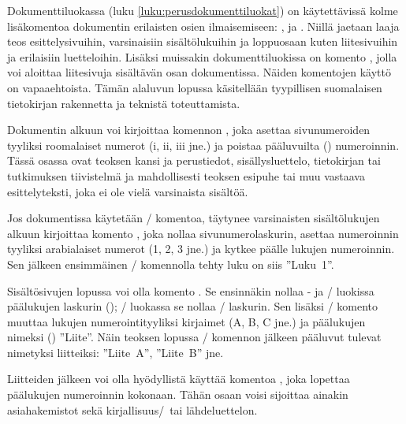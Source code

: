 Dokumenttiluokassa  (luku \ref{luku:perusdokumenttiluokat})
on käytettävissä kolme lisäkomentoa dokumentin erilaisten osien
ilmaisemiseen: ,  ja
. Niillä jaetaan laaja teos esittelysivuihin,
varsinaisiin sisältölukuihin ja loppuosaan kuten liitesivuihin ja
erilaisiin luetteloihin. Lisäksi muissakin dokumenttiluokissa on komento
, jolla voi aloittaa liitesivuja sisältävän osan
dokumentissa. Näiden komentojen käyttö on vapaaehtoista. Tämän alaluvun
lopussa käsitellään tyypillisen suomalaisen tietokirjan rakennetta ja
teknistä toteuttamista.

Dokumentin alkuun voi kirjoittaa komennon , joka
asettaa sivunumeroiden tyyliksi roomalaiset numerot (i, ii, iii jne.) ja
poistaa pääluvuilta () numeroinnin. Tässä osassa ovat
teoksen kansi ja perustiedot, sisällysluettelo, tietokirjan tai
tutkimuksen tiivistelmä ja mahdollisesti teoksen esipuhe tai muu
vastaava esittelyteksti, joka ei ole vielä varsinaista sisältöä.

Jos dokumentissa käytetään \-/ komentoa, täytynee
varsinaisten sisältölukujen alkuun kirjoittaa komento
, joka nollaa sivunumerolaskurin, asettaa
numeroinnin tyyliksi arabialaiset numerot (1, 2, 3 jne.) ja kytkee
päälle lukujen numeroinnin. Sen jälkeen ensimmäinen \-/
komennolla tehty luku on siis ''Luku~1''.

Sisältösivujen lopussa voi olla komento . Se
ensinnäkin nollaa - ja \-/ luokissa
päälukujen laskurin (); \-/ luokassa se
nollaa \-/ laskurin. Sen lisäksi \-/
komento muuttaa lukujen numerointityyliksi kirjaimet (A, B, C jne.) ja
päälukujen nimeksi () ''Liite''. Näin teoksen
lopussa \-/ komennon jälkeen pääluvut tulevat
nimetyksi liitteiksi: ''Liite~A'', ''Liite~B'' jne.

Liitteiden jälkeen voi olla hyödyllistä käyttää komentoa
, joka lopettaa päälukujen numeroinnin kokonaan.
Tähän osaan voisi sijoittaa ainakin asiahakemistot sekä kirjallisuus\-/\
tai lähdeluettelon.

